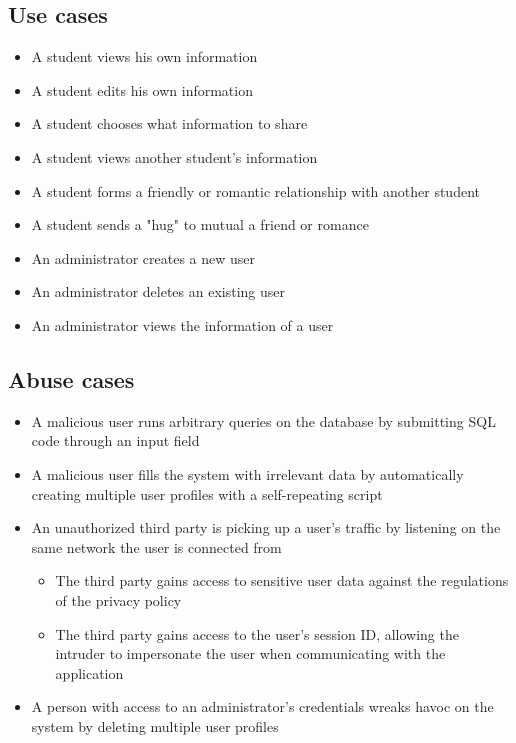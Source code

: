 \documentclass[a4paper]{article}
\begin{document}
\subsection{Use cases}
\begin{itemize}
\item A student views his own information
\item A student edits his own information
\item A student chooses what information to share
\item A student views another student’s information
\item A student forms a friendly or romantic relationship with another student
\item A student sends a "hug" to mutual a friend or romance
\item An administrator creates a new user
\item An administrator deletes an existing user
\item An administrator views the information of a user
\end{itemize}

\subsection{Abuse cases}
\begin{itemize}
\item A malicious user runs arbitrary queries on the database by submitting SQL code through an input field
\item A malicious user fills the system with irrelevant data by automatically creating multiple user profiles with a self-repeating script
\item An unauthorized third party is picking up a user's traffic by listening on the same network the user is connected from
	\begin{itemize}
		\item The third party gains access to sensitive user data against the regulations of the privacy policy
		\item The third party gains access to the user's session ID, allowing the intruder to impersonate the user when communicating with the application
	\end{itemize}
\item A person with access to an administrator's credentials wreaks havoc on the system by deleting multiple user profiles
\end{itemize}
\end{document}
